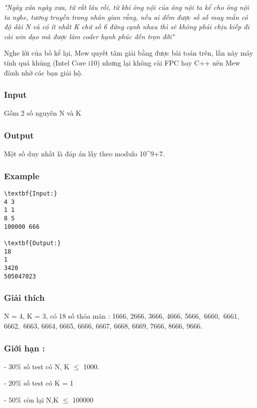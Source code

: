 

\emph{"Ngày xửa ngày xưa, từ rất lâu rồi, từ khi ông nội của ông nội ta kể cho ông nội ta nghe, tương truyền trong nhân gian rằng, nếu ai đếm được số số may mắn có độ dài N và có ít nhất K chữ số 6 đứng cạnh nhau thì sẽ không phải chịu kiếp đi cài win dạo mà được làm coder hạnh phúc đến trọn đời" }

Nghe lời của bố kể lại, Mew quyết tâm giải bằng được bài toán trên, lần này máy tính quá khủng (Intel Core i10) nhưng lại không cài FPC hay C++ nên Mew đành nhờ các bạn giải hộ.

\subsubsection{Input}

Gồm 2 số nguyên N và K

\subsubsection{Output}

Một số duy nhất là đáp án lấy theo modulo 10\textasciicircum9+7.

\subsubsection{Example}
\begin{verbatim}
\textbf{Input:}
4 3
1 1
8 5
100000 666

\textbf{Output:}
18
1
3420
505047023
\end{verbatim}

\subsubsection{Giải thích}

N = 4, K = 3, có 18 số thỏa mãn : 1666, 2666, 3666, 4666, 5666, 6660, 6661, 6662, 6663, 6664, 6665, 6666, 6667, 6668, 6669, 7666, 8666, 9666.

\subsubsection{Giới hạn :}

- 30\% số test có N, K  $\le$  1000.

- 20\% số test có K = 1

- 50\% còn lại N,K  $\le$  100000 
